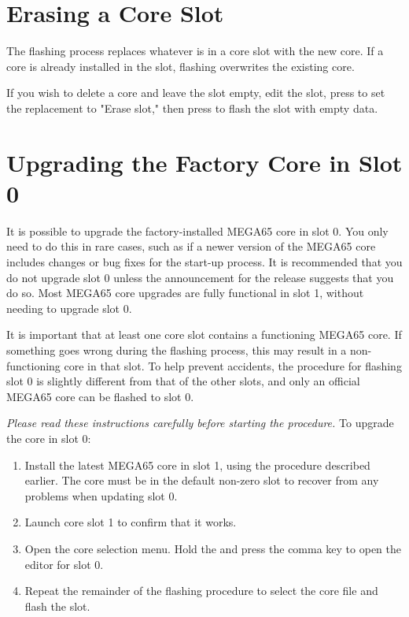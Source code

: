 \section{Erasing a Core Slot}

The flashing process replaces whatever is in a core slot with the new core. If a core is already installed in the slot, flashing overwrites the existing core.

If you wish to delete a core and leave the slot empty, edit the slot, press  to set the replacement to "Erase slot," then press  to flash the slot with empty data.

\section{Upgrading the Factory Core in Slot 0}

It is possible to upgrade the factory-installed MEGA65 core in slot 0. You only need to do this in rare cases, such as if a newer version of the MEGA65 core includes changes or bug fixes for the start-up process. It is recommended that you do not upgrade slot 0 unless the announcement for the release suggests that you do so. Most MEGA65 core upgrades are fully functional in slot 1, without needing to upgrade slot 0.

It is important that at least one core slot contains a functioning MEGA65 core. If something goes wrong during the flashing process, this may result in a non-functioning core in that slot. To help prevent accidents, the procedure for flashing slot 0 is slightly different from that of the other slots, and only an official MEGA65 core can be flashed to slot 0.

{\em Please read these instructions carefully before starting the procedure.} To upgrade the core in slot 0:

\begin{enumerate}
  \item Install the latest MEGA65 core in slot 1, using the procedure described earlier. The core must be in the default non-zero slot to recover from any problems when updating slot 0.
  \item Launch core slot 1 to confirm that it works.
  \item Open the core selection menu. Hold the \megasymbolkey and press the comma key to open the editor for slot 0.
  \item Repeat the remainder of the flashing procedure to select the core file and flash the slot.
\end{enumerate}

